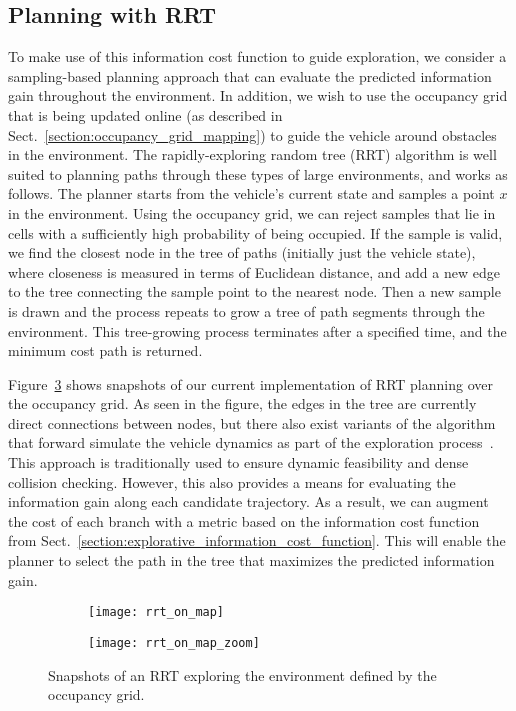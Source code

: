 \subsection{Planning with RRT}
\label{sec:planner}

To make use of this information cost function to guide exploration, we consider a sampling-based planning approach that can evaluate the predicted information gain throughout the environment. In addition, we wish to use the occupancy grid that is being updated online (as described in Sect.~\ref{section:occupancy_grid_mapping}) to guide the vehicle around obstacles in the environment. The rapidly-exploring random tree (RRT) algorithm is well suited to planning paths through these types of large environments, and works as follows.
The planner starts from the vehicle's current state and samples a point $x$ in the environment. Using the occupancy grid, we can reject samples that lie in cells with a sufficiently high probability of being occupied. If the sample is valid, we find the closest node in the tree of paths (initially just the vehicle state), where closeness is measured in terms of Euclidean distance, and add a new edge to the tree connecting the sample point to the nearest node.
Then a new sample is drawn and the process repeats to grow a tree of path segments through the environment. This tree-growing process terminates after a specified time, and the minimum cost path is returned.

Figure~\ref{fig:rrt_on_slam_map} shows snapshots of our current implementation of RRT planning over the occupancy grid. As seen in the figure, the edges in the tree are currently direct connections between nodes, but there also exist variants of the algorithm that forward simulate the vehicle dynamics as part of the exploration process~\cite{Kuwata09_TCST}. This approach is traditionally used to ensure dynamic feasibility and dense collision checking. However, this also provides a means for evaluating the information gain along each candidate trajectory. As a result, we can augment the cost of each branch with a metric based on the information cost function from Sect.~\ref{section:explorative_information_cost_function}. This will enable the planner to select the path in the tree that maximizes the predicted information gain.

\begin{figure}[t]
\centering
\begin{subfigure}[b]{0.49\linewidth}
\texttt{[image: rrt\_on\_map]}
\label{fig:rrt_on_map}
\end{subfigure}
\begin{subfigure}[b]{0.49\linewidth}
\texttt{[image: rrt\_on\_map\_zoom]}
\label{fig:rrt_on_map_zoom}
\end{subfigure}
\caption{Snapshots of an RRT exploring the environment defined by the occupancy grid. \label{fig:rrt_on_slam_map}}
\end{figure}

